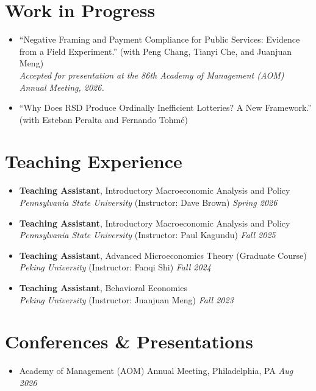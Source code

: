 \documentclass[letterpaper,11pt]{article}
\begin{document}
\section*{Work in Progress}
\begin{itemize}[leftmargin=1.5em, noitemsep, topsep=4pt, itemsep=6pt]
    \item ``Negative Framing and Payment Compliance for Public Services: Evidence from a Field Experiment.'' (with Peng Chang, Tianyi Che, and Juanjuan Meng) \\
    \textit{Accepted for presentation at the 86th Academy of Management (AOM) Annual Meeting, 2026.}
    \item ``Why Does RSD Produce Ordinally Inefficient Lotteries? A New Framework.'' (with Esteban Peralta and Fernando Tohm\'e)
\end{itemize}

\section*{Teaching Experience}
\begin{itemize}[leftmargin=1.5em, noitemsep, topsep=4pt, itemsep=4pt]
    \item \textbf{Teaching Assistant}, Introductory Macroeconomic Analysis and Policy \\
    \textit{Pennsylvania State University} (Instructor: Dave Brown) \hfill \textit{Spring 2026}
    
    \item \textbf{Teaching Assistant}, Introductory Macroeconomic Analysis and Policy \\
    \textit{Pennsylvania State University} (Instructor: Paul Kagundu) \hfill \textit{Fall 2025}
    
    \item \textbf{Teaching Assistant}, Advanced Microeconomics Theory (Graduate Course) \\
    \textit{Peking University} (Instructor: Fanqi Shi) \hfill \textit{Fall 2024}

    \item \textbf{Teaching Assistant}, Behavioral Economics \\
    \textit{Peking University} (Instructor: Juanjuan Meng) \hfill \textit{Fall 2023}
\end{itemize}

\section*{Conferences \& Presentations}
\begin{itemize}[leftmargin=1.5em, noitemsep, topsep=4pt, itemsep=4pt]
    \item Academy of Management (AOM) Annual Meeting, Philadelphia, PA \hfill \textit{Aug 2026}
\end{itemize}
\end{document}
